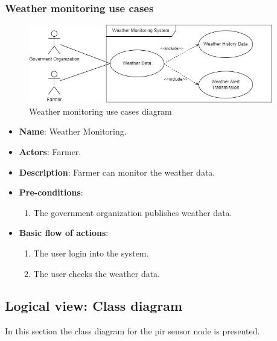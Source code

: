 \subsubsection*{Weather monitoring use cases}
\begin{figure}[H]
    \centering
    \includegraphics[width=0.95\textwidth]{./images/6/weather_uses.png}
    \caption{Weather monitoring use cases diagram}
\end{figure}
\begin{itemize}
    \item \textbf{Name}: Weather Monitoring.
    \item \textbf{Actors}: Farmer.
    \item \textbf{Description}: Farmer can monitor the weather data.
    \item \textbf{Pre-conditions}:
        \begin{enumerate}
            \item The government organization publishes weather data.
        \end{enumerate}
    \item \textbf{Basic flow of actions}:
        \begin{enumerate}
            \item The user login into the system.
            \item The user checks the weather data.
        \end{enumerate}
\end{itemize}

\clearpage
\subsection{Logical view: Class diagram}

In this section the class diagram for the \acrshort{pir} sensor node is presented.

